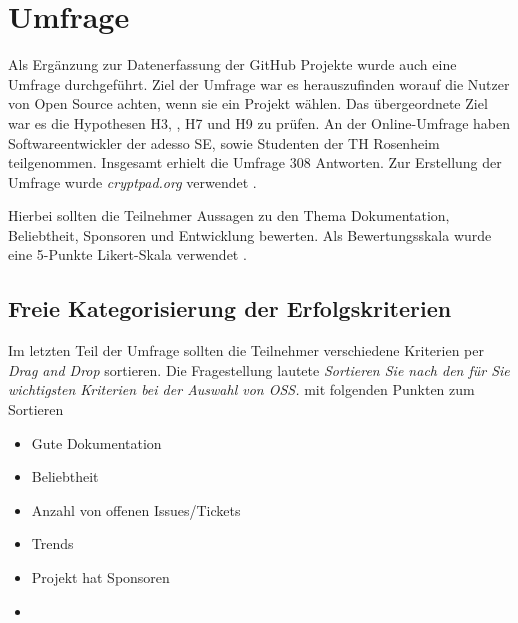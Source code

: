\chapter{Umfrage}


Als Ergänzung zur Datenerfassung der GitHub Projekte wurde auch eine Umfrage durchgeführt.
Ziel der Umfrage war es herauszufinden worauf die Nutzer von Open Source achten, wenn sie ein Projekt
wählen. Das übergeordnete Ziel war es die Hypothesen H3, , H7 und H9 zu prüfen.
An der Online-Umfrage haben Softwareentwickler der adesso SE, sowie Studenten der TH Rosenheim teilgenommen.
Insgesamt erhielt die Umfrage 308 Antworten. Zur Erstellung der Umfrage wurde \textit{cryptpad.org} 
verwendet \cite{Cryptpad_org}.

Hierbei sollten die Teilnehmer Aussagen zu den Thema Dokumentation, Beliebtheit, Sponsoren und
Entwicklung bewerten. Als Bewertungsskala wurde eine 5-Punkte Likert-Skala verwendet \cite{likertScale}.




\newpage


\newpage


\newpage


\newpage



\newpage %
\cleardoubleemptypage
\section{Freie Kategorisierung der Erfolgskriterien}\label{sec:umfrage_last_question}


Im letzten Teil der Umfrage sollten die Teilnehmer verschiedene Kriterien per
\textit{Drag and Drop} sortieren. Die Fragestellung lautete
\textit{Sortieren Sie nach den für Sie wichtigsten Kriterien bei der Auswahl von OSS.}
mit folgenden Punkten zum Sortieren


\begin{multicols}{2}
    \begin{itemize}
        \setlength\itemsep{0em}
        \item Gute Dokumentation
        \item Beliebtheit
        \item Anzahl von offenen Issues/Tickets
        \item Trends
        \item Projekt hat Sponsoren
        \item []
    \end{itemize}
\end{multicols}


